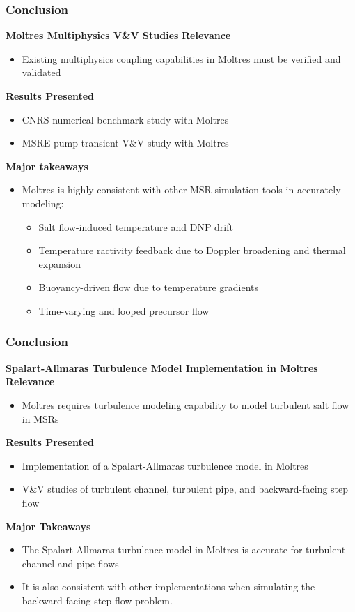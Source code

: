 \begin{frame}
  \frametitle{Conclusion}
  \begin{block}{\textbf{Moltres Multiphysics V\&V Studies}}
    \textbf{Relevance}
    \begin{itemize}
      \item Existing multiphysics coupling capabilities in Moltres must be verified and validated
    \end{itemize}
    \textbf{Results Presented}
    \begin{itemize}
      \item CNRS numerical benchmark study with Moltres
      \item MSRE pump transient V\&V study with Moltres
    \end{itemize}
    \textbf{Major takeaways}
    \begin{itemize}
      \item Moltres is highly consistent with other MSR simulation tools in accurately modeling:
      \begin{itemize}
        \item Salt flow-induced temperature and DNP drift
        \item Temperature ractivity feedback due to Doppler broadening and thermal expansion
        \item Buoyancy-driven flow due to temperature gradients
        \item Time-varying and looped precursor flow
      \end{itemize}
    \end{itemize}
  \end{block}
\end{frame}

\begin{frame}
  \frametitle{Conclusion}
  \begin{block}{\textbf{Spalart-Allmaras Turbulence Model Implementation in Moltres}}
    \textbf{Relevance}
    \begin{itemize}
      \item Moltres requires turbulence modeling capability to model turbulent salt
        flow in MSRs
    \end{itemize}
    \textbf{Results Presented}
    \begin{itemize}
      \item Implementation of a Spalart-Allmaras turbulence model in Moltres
      \item V\&V studies of turbulent channel, turbulent pipe, and backward-facing step flow
    \end{itemize}
    \textbf{Major Takeaways}
    \begin{itemize}
      \item The Spalart-Allmaras turbulence model in Moltres is accurate for turbulent channel and
        pipe flows
      \item It is also consistent with other implementations when simulating the
        backward-facing step flow problem.
    \end{itemize}
  \end{block}
\end{frame}

